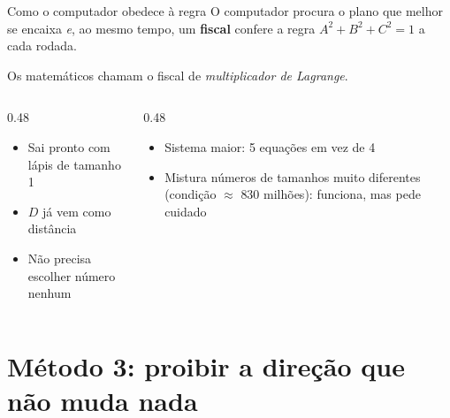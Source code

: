 \documentclass[aspectratio=169,11pt]{beamer}
\begin{document}
\begin{frame}{Como o computador obedece à regra}
  O computador procura o plano que melhor se encaixa \emph{e}, ao mesmo tempo, um
  \textcolor{corInjuncao}{\textbf{fiscal}} confere a regra $A^2 + B^2 + C^2 = 1$ a cada rodada.
  \smallskip

  {\small\textcolor{mStoneMid}{Os matemáticos chamam o fiscal de \emph{multiplicador de Lagrange}.}}
  \begin{columns}[T]
    \begin{column}{0.48\textwidth}
      \begin{ideia}[title={Vantagens}]
        \begin{itemize}
          \item Sai pronto com lápis de tamanho 1
          \item $D$ já vem como distância
          \item Não precisa escolher número nenhum
        \end{itemize}
      \end{ideia}
    \end{column}
    \begin{column}{0.48\textwidth}
      \begin{cuidado}[title={Cuidados}]
        \begin{itemize}
          \item Sistema maior: 5 equações em vez de 4
          \item Mistura números de tamanhos muito diferentes (condição
                $\approx$ \alert{830 milhões}): funciona, mas pede cuidado
        \end{itemize}
      \end{cuidado}
    \end{column}
  \end{columns}
\end{frame}

\section{Método 3: proibir a direção que não muda nada}
\end{document}
